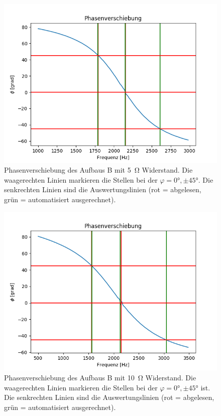 \documentclass[12pt,a4paper]{article}
\begin{document}
\begin{figure}[H]
	\centering
	\includegraphics[scale=0.7]{Bilder/Serie_Phasenverschiebung_B_5.png}
	\caption{Phasenverschiebung des Aufbaus B mit \SI{5}{\ohm} Widerstand. Die waagerechten Linien markieren die Stellen bei der $\varphi = \ang{0}, \pm \ang{45}$. Die senkrechten Linien sind die Auswertungslinien (rot = abgelesen, grün = automatisiert ausgerechnet).}
	\label{fig:Serie_Phasenverschiebung_B_5}
\end{figure}
\begin{figure}[H]
	\centering
	\includegraphics[scale=0.7]{Bilder/Serie_Phasenverschiebung_B_10.png}
	\caption{Phasenverschiebung des Aufbaus B mit \SI{10}{\ohm} Widerstand. Die waagerechten Linien markieren die Stellen bei der $\varphi = \ang{0}, \pm \ang{45}$ ist. Die senkrechten Linien sind die Auswertungslinien (rot = abgelesen, grün = automatisiert ausgerechnet).}
	\label{fig:Serie_Phasenverschiebung_B_10}
\end{figure}
\end{document}

